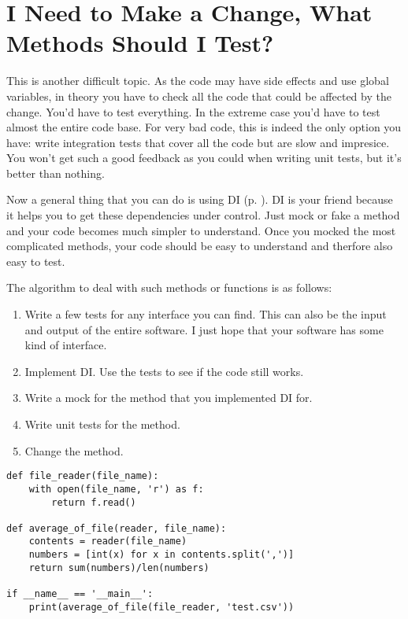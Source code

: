 \chapter{I Need to Make a Change, What Methods Should I Test?}

This is another difficult topic. As the code may have side effects and use global variables, in theory you have to check all the code that could be affected by the change. You'd have to test everything. In the extreme case you'd have to test almost the entire code base. For very bad code, this is indeed the only option you have: write integration tests that cover all the code but are slow and impresice. You won't get such a good feedback as you could when writing unit tests, but it's better than nothing.

Now a general thing that you can do is using DI (p. \pageref{sec:dependency_injection}). DI is your friend because it helps you to get these dependencies under control. Just mock or fake a method and your code becomes much simpler to understand. Once you mocked the most complicated methods, your code should be easy to understand and therfore also easy to test.

The algorithm to deal with such methods or functions is as follows:
\begin{enumerate}
    \item Write a few tests for any interface you can find. This can also be the input and output of the entire software. I just hope that your software has some kind of interface.
    \item Implement DI. Use the tests to see if the code still works.
    \item Write a mock for the method that you implemented DI for.
    \item Write unit tests for the method.
    \item Change the method.
\end{enumerate}


\begin{programcode}{}
\begin{verbatim}
def file_reader(file_name):
    with open(file_name, 'r') as f:
        return f.read()

def average_of_file(reader, file_name):
    contents = reader(file_name)
    numbers = [int(x) for x in contents.split(',')]
    return sum(numbers)/len(numbers)

if __name__ == '__main__':
    print(average_of_file(file_reader, 'test.csv'))
\end{verbatim}
\end{programcode}


